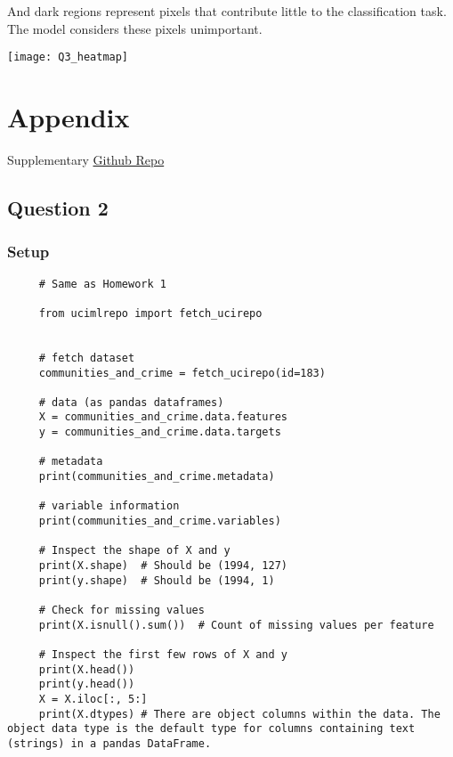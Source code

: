 \documentclass[letterpaper]{article}
\begin{document}
		And dark regions represent pixels that contribute little to the classification task. The model considers these pixels unimportant.
		
		 \begin{center}
			\texttt{[image: Q3\_heatmap]}
		\end{center}
		
		
		\clearpage
	\section{Appendix}
		
		Supplementary \href{https://github.com/zongyiliu/STAT_5241/tree/main/Homework_2}{Github Repo}
     \subsection{Question 2}
     \subsubsection{Setup}
     \begin{lstlisting}
     # Same as Homework 1
     
     from ucimlrepo import fetch_ucirepo 
     
     
     # fetch dataset 
     communities_and_crime = fetch_ucirepo(id=183) 
     
     # data (as pandas dataframes) 
     X = communities_and_crime.data.features 
     y = communities_and_crime.data.targets 
     
     # metadata 
     print(communities_and_crime.metadata) 
     
     # variable information 
     print(communities_and_crime.variables) 
     
     # Inspect the shape of X and y
     print(X.shape)  # Should be (1994, 127)
     print(y.shape)  # Should be (1994, 1)
     
     # Check for missing values
     print(X.isnull().sum())  # Count of missing values per feature
     
     # Inspect the first few rows of X and y
     print(X.head())
     print(y.head())
     X = X.iloc[:, 5:]
     print(X.dtypes) # There are object columns within the data. The object data type is the default type for columns containing text (strings) in a pandas DataFrame.
     \end{lstlisting}
	
\end{document}
